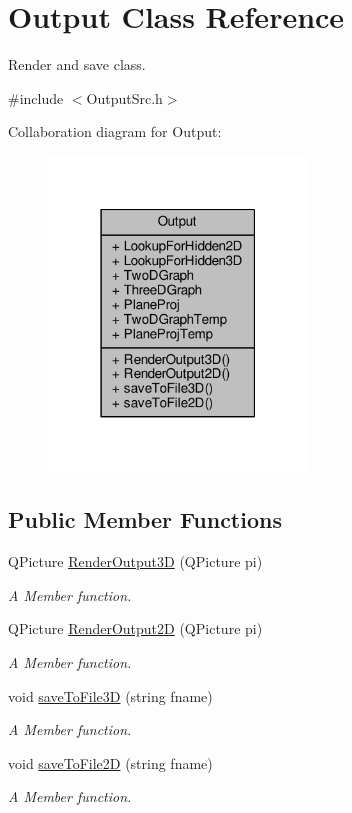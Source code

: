 \hypertarget{classOutput}{}\section{Output Class Reference}
\label{classOutput}


Render and save class.  




{\ttfamily \#include $<$Output\+Src.\+h$>$}



Collaboration diagram for Output\+:\nopagebreak
\begin{figure}[H]
\begin{center}
\leavevmode
\includegraphics[width=195pt]{classOutput__coll__graph}
\end{center}
\end{figure}
\subsection*{Public Member Functions}
\begin{DoxyCompactItemize}
\item 
Q\+Picture \hyperlink{classOutput_aac99693b73661bf4af821aa5d32094ea}{Render\+Output3D} (Q\+Picture pi)
\begin{DoxyCompactList}\small\item\em A Member function. \end{DoxyCompactList}\item 
Q\+Picture \hyperlink{classOutput_aabbc20a5012e08ef1d242c2800ba8421}{Render\+Output2D} (Q\+Picture pi)
\begin{DoxyCompactList}\small\item\em A Member function. \end{DoxyCompactList}\item 
void \hyperlink{classOutput_a23f2365e8a4f60a0845de5e637266588}{save\+To\+File3D} (string fname)
\begin{DoxyCompactList}\small\item\em A Member function. \end{DoxyCompactList}\item 
void \hyperlink{classOutput_ae97e0cb97e7d7b5a8d2b044319a2f5b9}{save\+To\+File2D} (string fname)
\begin{DoxyCompactList}\small\item\em A Member function. \end{DoxyCompactList}\end{DoxyCompactItemize}
